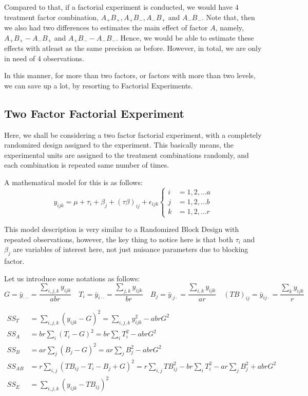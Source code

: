 \documentclass[12pt]{article}
\theoremstyle{definition}
\begin{document}
Compared to that, if a factorial experiment is conducted, we would have $4$ treatment factor combination, $A_{+}B_{+}, A_{+}B_{-}, A_{-}B_{+}$ and $A_{-}B_{-}$. Note that, then we also had two differences to estimates the main effect of factor $A$, namely, $A_{+}B_{+} - A_{-}B_{+}$ and $A_{+}B_{-} - A_{-}B_{-}$. Hence, we would be able to estimate these effects with atleast as the same precision as before. However, in total, we are only in need of $4$ observations.

In this manner, for more than two factors, or factors with more than two levels, we can save up a lot, by resorting to Factorial Experiments.


\subsection{Two Factor Factorial Experiment}

Here, we shall be considering a two factor factorial experiment, with a completely randomized design assigned to the experiment. This basically means, the experimental units are assigned to the treatment combinations randomly, and each combination is repeated same number of times.

A mathematical model for this is as follows:
$$
y_{ijk} = \mu + \tau_i + \beta_j + (\tau\beta)_{ij} + \epsilon_{ijk}
\begin{cases}
i & = 1, 2, \dots a\\
j & = 1, 2, \dots b\\
k & = 1, 2, \dots r
\end{cases}
$$

This model description is very similar to a Randomized Block Design with repeated observations, however, the key thing to notice here is that both $\tau_i$ and $\beta_j$ are variables of interest here, not just  nuisance parameters due to blocking factor.

Let us introduce some notations as follows:
  $$G = \bar{y}_{\cdot\cdot\cdot} = \frac{\sum_{i,j,k} y_{ijk}}{abr}  \quad
  T_i = \bar{y}_{i\cdot\cdot} = \frac{\sum_{j,k} y_{ijk}}{br} \quad
  B_j = \bar{y}_{\cdot j \cdot} = \frac{\sum_{i,k} y_{ijk}}{ar} \quad (TB)_{ij} = \bar{y}_{ij\cdot} = \frac{\sum_{k} y_{ijk}}{r}$$
    
\begin{align*}
    SS_T & = \sum_{i,j,k} \left( y_{ijk} - G \right)^2  = \sum_{i,j,k} y_{ijk}^2 - abr G^2\\
    SS_A & = br \sum_{i} (T_i - G)^2 = br \sum_{i}T_i^2 - abr G^2\\
    SS_B & = ar \sum_{j} (B_j - G)^2 = ar \sum_{j}B_j^2 - abr G^2\\
    SS_{AB} & = r \sum_{i, j} \left( TB_{ij} - T_i - B_j + G \right)^2 = r\sum_{i, j} TB_{ij}^2 - br \sum_{i} T_i^2 - ar \sum_{j} B_j^2 + abr G^2 \\
    SS_{E} & = \sum_{i, j, k} \left( y_{ijk} - TB_{ij} \right)^2
\end{align*}
\end{document}
